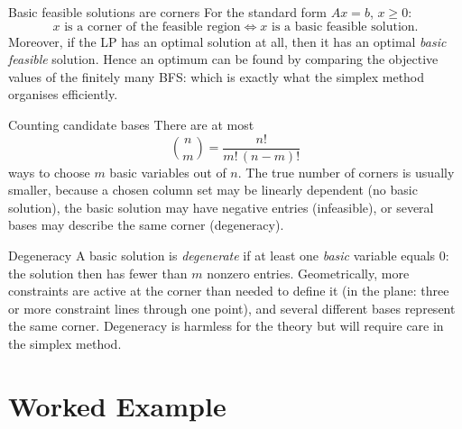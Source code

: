 \begin{rulebox}{Basic feasible solutions are corners}
For the standard form $Ax=b$, $x\ge 0$:
\[
  x \text{ is a corner of the feasible region}
  \iff
  x \text{ is a basic feasible solution.}
\]
Moreover, if the LP has an optimal solution at all, then it has an optimal
\emph{basic feasible} solution. Hence an optimum can be found by comparing
the objective values of the finitely many BFS: which is exactly what
the simplex method organises efficiently.
\end{rulebox}

\begin{rulebox}{Counting candidate bases}
There are at most
\[
  \binom{n}{m}=\frac{n!}{m!\,(n-m)!}
\]
ways to choose $m$ basic variables out of $n$. The true number of corners
is usually smaller, because a chosen column set may be linearly dependent
(no basic solution), the basic solution may have negative entries
(infeasible), or several bases may describe the same corner (degeneracy).
\end{rulebox}

\begin{rulebox}{Degeneracy}
A basic solution is \emph{degenerate} if at least one
\emph{basic} variable equals $0$: the solution then has fewer than $m$
nonzero entries. Geometrically, more constraints are active at the corner
than needed to define it (in the plane: three or more constraint lines
through one point), and several different bases represent the same corner.
Degeneracy is harmless for the theory but will require care in the simplex
method.
\end{rulebox}

\section{Worked Example}

